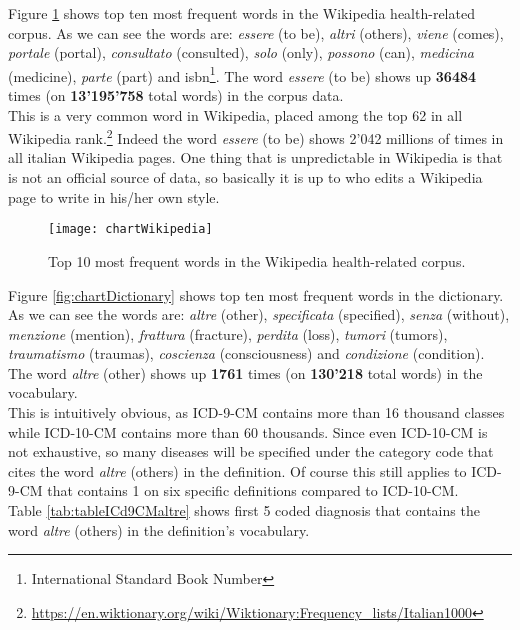 Figure \ref{fig:chartWikipedia} shows top ten most frequent words in the Wikipedia health-related corpus. As we can see the words are: \textit{essere} (to be), \textit{altri} (others), \textit{viene} (comes), \textit{portale} (portal), \textit{consultato} (consulted), \textit{solo} (only), \textit{possono} (can), \textit{medicina} (medicine), \textit{parte} (part) and isbn\footnote{International Standard Book Number}.
The word \textit{essere} (to be) shows up \textbf{36484} times (on \textbf{13'195'758} total words) in the corpus data.\\
This is a very common word in Wikipedia, placed among the top 62 in all Wikipedia rank.\footnote{\url{https://en.wiktionary.org/wiki/Wiktionary:Frequency_lists/Italian1000}} Indeed the word \textit{essere} (to be) shows 2'042 millions of times in all italian Wikipedia pages. One thing that is unpredictable in Wikipedia is that is not an official source of data, so basically it is up to who edits a Wikipedia page to write in his/her own style.\\
\begin{figure}[ht]
	\centering
	\texttt{[image: chartWikipedia]}
	\caption[Top 10 most frequent words in Wikipedia health-specific corpus]{Top 10 most frequent words in the Wikipedia health-related corpus.}
	\label{fig:chartWikipedia}
\end{figure}


Figure \ref{fig:chartDictionary} shows top ten most frequent words in the dictionary. As we can see the words are: \textit{altre} (other), \textit{specificata} (specified), \textit{senza} (without), \textit{menzione} (mention), \textit{frattura} (fracture),  \textit{perdita} (loss), \textit{tumori} (tumors), \textit{traumatismo} (traumas), \textit{coscienza} (consciousness) and \textit{condizione} (condition).
The word \textit{altre} (other) shows up \textbf{1761} times (on \textbf{130'218} total words) in the vocabulary.\\
This is intuitively obvious, as ICD-9-CM contains more than 16 thousand classes while ICD-10-CM contains more than 60 thousands. Since even ICD-10-CM is not exhaustive, so many diseases will be specified under the category code that cites the word \textit{altre} (others) in the definition. Of course this still applies to ICD-9-CM that contains 1 on six specific definitions compared to ICD-10-CM.\\
Table \ref{tab:tableICd9CMaltre} shows first 5 coded diagnosis that contains the word \textit{altre} (others) in the definition's vocabulary.

